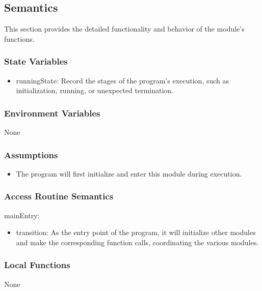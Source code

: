 \documentclass[12pt, titlepage]{article}
\begin{document}
\subsection{Semantics}

This section provides the detailed functionality and behavior of the module’s
functions.

\subsubsection{State Variables}

\begin{itemize}
\item runningState: Record the stages of the program's execution, such as
initialization, running, or unexpected termination.
\end{itemize}

\subsubsection{Environment Variables}

None

\subsubsection{Assumptions}

\begin{itemize}
\item The program will first initialize and enter this module during execution.
\end{itemize}

\subsubsection{Access Routine Semantics}

\noindent mainEntry:
\begin{itemize}
\item transition: As the entry point of the program, it will initialize other
modules and make the corresponding function calls, coordinating the various
modules.
\end{itemize}

\subsubsection{Local Functions}

None

\newpage
\end{document}
